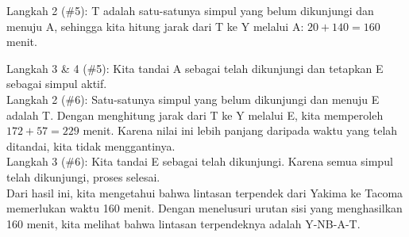 \begin{example}{}
\noindent Langkah 2 (\#5):  T adalah satu-satunya simpul yang belum dikunjungi dan menuju A, sehingga kita hitung jarak dari T ke Y melalui A: $20+140 = 160$ menit.  \\
\par{}\label{fig:graphtheory-dor1-tikz22}%


\noindent Langkah 3 \& 4 (\#5):  Kita tandai A sebagai telah dikunjungi dan tetapkan E sebagai simpul aktif.\\

\noindent Langkah 2 (\#6):  Satu-satunya simpul yang belum dikunjungi dan menuju E adalah T.  Dengan menghitung jarak dari T ke Y melalui E, kita memperoleh $172+57 = 229$ menit.  Karena nilai ini lebih panjang daripada waktu yang telah ditandai, kita tidak menggantinya.  \\

\noindent Langkah 3 (\#6):  Kita tandai E sebagai telah dikunjungi.  Karena semua simpul telah dikunjungi, proses selesai.  \\

Dari hasil ini, kita mengetahui bahwa lintasan terpendek dari Yakima ke Tacoma memerlukan waktu 160 menit.  Dengan menelusuri urutan sisi yang menghasilkan 160 menit, kita melihat bahwa lintasan terpendeknya adalah Y-NB-A-T. 
\end{example}

